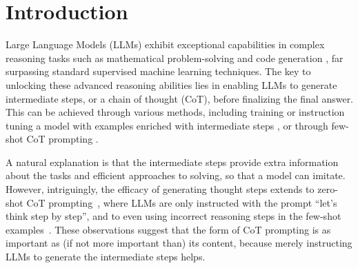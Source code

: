  
\section{Introduction}\label{sec:intro}
 

Large Language Models (LLMs) exhibit exceptional capabilities in complex reasoning tasks such as mathematical problem-solving and code generation \citep{Chowdhery2023, anil2023palm, achiam2023gpt, FunSearch2023, trinh2024solving}, far  surpassing standard supervised machine learning techniques. The key to unlocking these advanced reasoning abilities lies in enabling LLMs to generate intermediate steps, or a chain of thought (CoT), before finalizing the final answer. This can be achieved through various methods, including training or instruction tuning a model with examples enriched with intermediate steps \citep{ling2017program, cobbe2021training, nye2021show, chung2022scaling}, or through few-shot CoT prompting \citep{reynolds2021prompt, nye2021show, wei2022chain}.

A natural explanation is that the intermediate steps provide extra information %
about the tasks and efficient approaches to solving, so 
that a model can imitate. %
However, intriguingly, the efficacy of generating thought steps extends to zero-shot CoT prompting~\citep{kojima2022large}, where LLMs are only instructed with the prompt ``let's think step by step'', and to even using incorrect reasoning steps in the few-shot examples~\citep{wang2022towards, madaan2022text}. %
These observations suggest that
the form of CoT prompting is as important as (if not more important than) its content, because merely instructing LLMs to generate the intermediate steps helps. 

